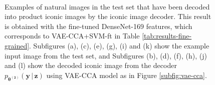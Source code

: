 \begin{figure}[t]
~
~
~
\caption{ Examples of natural images in the test set that have been decoded into product iconic images by the iconic image decoder. This result is obtained with the fine-tuned DenseNet-169 features, which corresponds to VAE-CCA+SVM-ft in Table \ref{tab:results-fine-grained}. Subfigures (a), (c), (e), (g), (i) and (k) show the example input image from the test set, and Subfigures (b), (d), (f), (h), (j) and (l) show the decoded iconic image from the decoder $p_{\boldsymbol{\theta^{(2)}}}(\mathbf{y}\,|\,\mathbf{z})$ using VAE-CCA model as in Figure \ref{subfig:vae-cca}.} \label{fig:decoded-images}
\end{figure}

